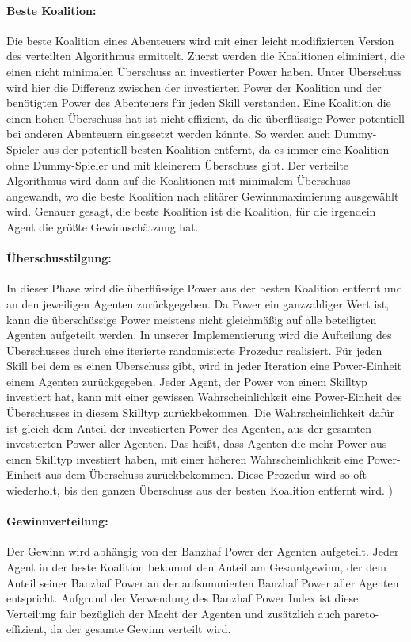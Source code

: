 \documentclass[fleqn,10pt]{SelfArx} %
\begin{document}
\paragraph{Beste Koalition:}
Die beste Koalition eines Abenteuers wird mit einer leicht modifizierten Version des verteilten Algorithmus ermittelt. Zuerst werden die Koalitionen eliminiert, die einen nicht minimalen Überschuss an investierter Power haben. Unter Überschuss wird hier die Differenz zwischen der investierten Power der Koalition und der benötigten Power des Abenteuers für jeden Skill verstanden. Eine Koalition die einen hohen Überschuss hat ist nicht effizient, da die überflüssige Power potentiell bei anderen Abenteuern eingesetzt werden könnte. So werden auch Dummy-Spieler aus der potentiell besten Koalition entfernt, da es immer eine Koalition ohne Dummy-Spieler und mit kleinerem Überschuss gibt. Der verteilte Algorithmus wird dann auf die Koalitionen mit minimalem Überschuss angewandt, wo die beste Koalition nach elitärer Gewinnmaximierung ausgewählt wird. Genauer gesagt, die beste Koalition ist die Koalition, für die irgendein Agent die größte Gewinnschätzung hat.

\paragraph{Überschusstilgung:} 
In dieser Phase wird die überflüssige Power aus der besten Koalition entfernt und an den jeweiligen Agenten zurückgegeben. Da Power ein ganzzahliger Wert ist, kann die überschüssige Power meistens nicht gleichmäßig auf alle beteiligten Agenten aufgeteilt werden. In unserer Implementierung wird die Aufteilung des Überschusses durch eine iterierte randomisierte Prozedur realisiert. Für jeden Skill bei dem es einen Überschuss gibt, wird in jeder Iteration eine Power-Einheit einem Agenten zurückgegeben. Jeder Agent, der Power von einem Skilltyp investiert hat, kann mit einer gewissen Wahrscheinlichkeit eine Power-Einheit des Überschusses in diesem Skilltyp zurückbekommen. Die Wahrscheinlichkeit dafür ist gleich dem Anteil der investierten Power des Agenten, aus der gesamten investierten Power aller Agenten. Das heißt, dass Agenten die mehr Power aus einen Skilltyp investiert haben, mit einer höheren Wahrscheinlichkeit eine Power-Einheit aus dem Überschuss zurückbekommen. Diese Prozedur wird so oft wiederholt, bis den ganzen Überschuss aus der besten Koalition entfernt wird.
)
\paragraph{Gewinnverteilung:}
Der Gewinn wird abhängig von der Banzhaf Power der Agenten aufgeteilt. Jeder Agent in der beste Koalition bekommt den Anteil am Gesamtgewinn, der dem Anteil seiner Banzhaf Power an der aufsummierten Banzhaf Power aller Agenten entspricht. Aufgrund der Verwendung des Banzhaf Power Index ist diese Verteilung fair bezüglich der Macht der Agenten und zusätzlich auch pareto-effizient, da der gesamte Gewinn verteilt wird.
\end{document}
